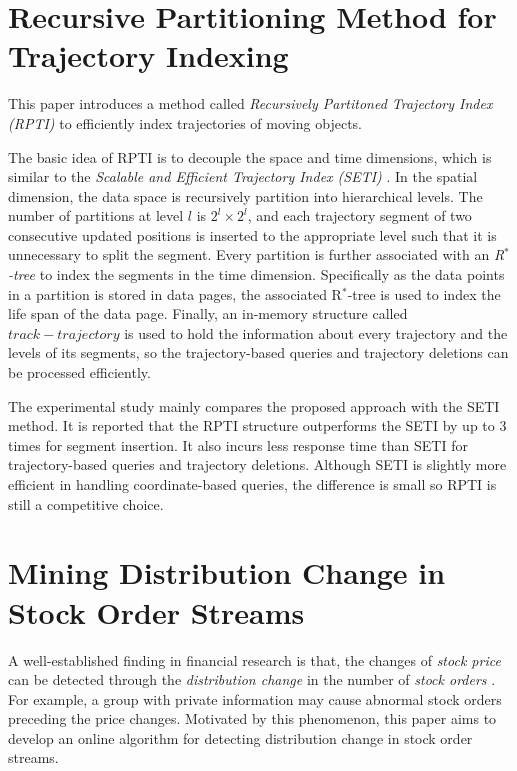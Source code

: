 \documentclass[paper=a4, fontsize=18pt]{article} %
\numberwithin{equation}{section} %
\numberwithin{figure}{section} %
\numberwithin{table}{section} %
\begin{document}
\section{Recursive Partitioning Method for Trajectory Indexing \cite{ARSZ10}}

This paper introduces a method called \emph{Recursively Partitoned Trajectory Index (RPTI)} to efficiently index trajectories of moving objects.

The basic idea of RPTI is to decouple the space and time dimensions, which is similar to the \emph{Scalable and Efficient Trajectory Index (SETI)} \cite{CEP03}. In the spatial dimension, the data space is recursively partition into hierarchical levels. The number of partitions at level $l$ is $2^l \times 2^l$, and each trajectory segment of two consecutive updated positions is inserted to the appropriate level such that it is unnecessary to split the segment. Every partition is further associated with an \emph{R$^*$-tree} to index the segments in the time dimension. Specifically as the data points in a partition is stored in data pages, the associated R$^*$-tree is used to index the life span of the data page. Finally, an in-memory structure called $track-trajectory$ is used to hold the information about every trajectory and the levels of its segments, so the trajectory-based queries and trajectory deletions can be processed efficiently.

The experimental study mainly compares the proposed approach with the SETI method. It is reported that the RPTI structure outperforms the SETI by up to 3 times for segment insertion. It also incurs less response time than SETI for trajectory-based queries and trajectory deletions. Although SETI is slightly more efficient in handling coordinate-based queries, the difference is small so RPTI is still a competitive choice.

\section{Mining Distribution Change in Stock Order Streams \cite{LWWZBR10}}

A well-established finding in financial research is that, the changes of \emph{stock price} can be detected through the \emph{distribution change} in the number of \emph{stock orders} \cite{EKOP96}. For example, a group with private information may cause abnormal stock orders preceding the price changes. Motivated by this phenomenon, this paper aims to develop an online algorithm for detecting distribution change in stock order streams.
\end{document}
